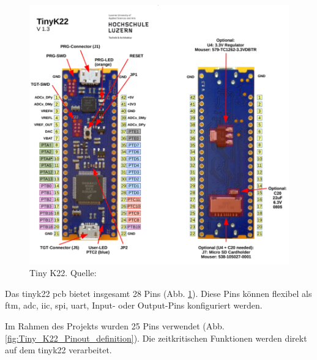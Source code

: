 \begin{figure}[H]
    \centering
    \includegraphics[width=0.8\linewidth]{img/Tiny_K22_PCB.png}
    \caption{Tiny K22. Quelle: \cite{tiny-K22-Pinout}}
    \label{fig:Tiny_K22_PCB}
\end{figure}


Das \gls{tinyk22} \acrshort{pcb} bietet insgesamt 28 Pins (Abb. \ref{fig:Tiny_K22_PCB}). Diese Pins können flexibel als \acrfull{ftm}, \acrfull{adc}, \acrfull{iic}, \acrfull{spi}, \acrshort{uart}, Input- oder Output-Pins konfiguriert werden.

Im Rahmen des Projekts wurden 25 Pins verwendet (Abb. \ref{fig:Tiny_K22_Pinout_definition}). Die zeitkritischen Funktionen werden direkt auf dem \gls{tinyk22} verarbeitet.

